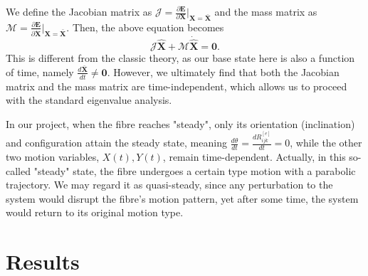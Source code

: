 \documentclass[lineno]{JFM-FLM_Au}
\begin{document}
We define the Jacobian matrix as $\mathbf{\mathcal{J}}=\frac{\partial \mathbf{E}}{\partial \mathbf{X}}\Big|_{\mathbf{X}=\bar{\mathbf{X}}}$ and the mass matrix as $\mathbf{\mathcal{M}}=\frac{\partial \mathbf{E}}{\partial \dot{\mathbf{X}}}\Big|_{\mathbf{X}=\bar{\mathbf{X}}}$. Then, the above equation becomes 
\begin{equation}
	\label{eqn:111}
	\mathbf{\mathcal{J}}\hat{\mathbf{X}}+\mathbf{\mathcal{M}}\dot{\hat{\mathbf{X}}}=\mathbf{0}.
\end{equation}
This is different from the classic theory, as our base state here is also a function of time, namely $\frac{d\bar{\mathbf{X}}}{dt}\neq\mathbf{0}$. However, we ultimately find that both the Jacobian matrix and the mass matrix are time-independent, which allows us to proceed with the standard eigenvalue analysis.

In our project, when the fibre reaches "steady", only its orientation (inclination) and configuration attain the steady state, meaning  $\frac{d\theta}{dt}=\frac{dR_{ijk}^{[e]}}{dt}=0$, while the other two motion variables, $X(t), Y(t)$, remain time-dependent. Actually, in this so-called "steady" state, the fibre undergoes a certain type motion with a parabolic trajectory. We may regard it as quasi-steady, since any perturbation to the system would disrupt the fibre's motion pattern, yet after some time, the system would return to its original motion type. 


\section{Results}
\end{document}
